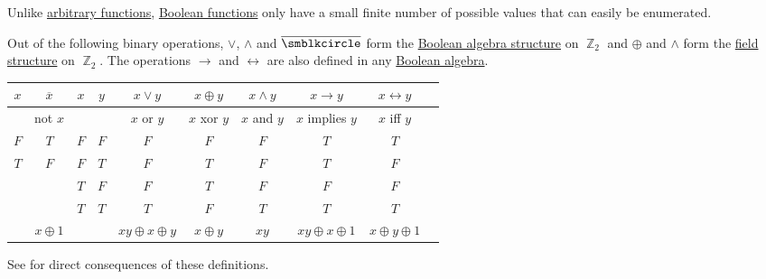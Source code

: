 \begin{definition}\label{def:standard_boolean_operators}
  Unlike \hyperref[def:function]{arbitrary functions}, \hyperref[def:boolean_function]{Boolean functions} only have a small finite number of possible values that can easily be enumerated.

  Out of the following binary operations, \( \vee \), \( \wedge \) and \( \overline{\anon} \) form the \hyperref[thm:f2_is_boolean_algebra]{Boolean algebra structure} on \( \BbbZ_2 \) and \( \oplus \) and \( \wedge \) form the \hyperref[def:field]{field structure} on \( \BbbZ_2 \). The operations \( \rightarrow \) and \( \leftrightarrow \) are also defined in any \hyperref[def:boolean_algebra]{Boolean algebra}.

  \begin{center}
    \begin{tabular}{c | c || c c | c c c c c c}
      \( x \) & \( \overline{x} \) & \( x \) & \( y \) & \( x \vee y \) & \( x \oplus y \)    & \( x \wedge y \) & \( x \rightarrow y \)   & \( x \leftrightarrow y \) \\
      \hline
              & not \( x \)        &         &         & \( x \) or \( y \)  & \( x \) xor \( y \) & \( x \) and \( y \)     & \( x \) implies \( y \) & \( x \) iff \( y \)       \\
      \hline
      \( F \) & \( T \)            & \( F \) & \( F \) & \( F \)             & \( F \)             & \( F \)                 & \( T \)                 & \( T \)                   \\
      \( T \) & \( F \)            & \( F \) & \( T \) & \( F \)             & \( T \)             & \( F \)                 & \( T \)                 & \( F \)                   \\
              &                    & \( T \) & \( F \) & \( F \)             & \( T \)             & \( F \)                 & \( F \)                 & \( F \)                   \\
              &                    & \( T \) & \( T \) & \( T \)             & \( F \)             & \( T \)                 & \( T \)                 & \( T \)                   \\
      \hline
              & \( x \oplus 1 \) &         &         & \( xy \oplus x \oplus y \) & \( x \oplus y \)    & \( xy \)            & \( xy \oplus x \oplus 1 \) & \( x \oplus y \oplus 1 \)
    \end{tabular}
  \end{center}

  See  for direct consequences of these definitions.
\end{definition}


